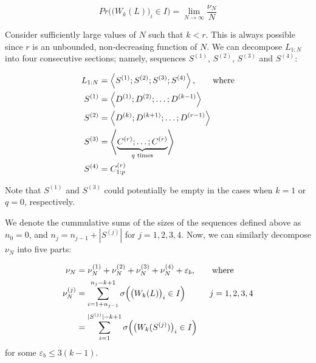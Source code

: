 \documentclass[11pt,a4paper]{tesis}
\theoremstyle{plain}
\theoremstyle{definition}
\begin{document}
\begin{equation*}
  Pr\Big( \big( W_k(L) \big)_i \in I \Big) = \lim_{N \to \infty} \frac{\nu_N}{N}
\end{equation*}

Consider sufficiently large values of $N$ such that $k < r$. This is always possible since $r$ is an unbounded, non-decreasing function of $N$. We can decompose $L_{1:N}$ into four consecutive sections; namely, sequences $S^{(1)}$, $S^{(2)}$, $S^{(3)}$ and $S^{(4)}$:

\begin{equation}
  \begin{aligned}
    L_{1:N} & = \left< S^{(1)} ; S^{(2)} ; S^{(3)} ; S^{(4)} \right> \text{, \hspace*{5mm} where} \\
    S^{(1)} & = \left< D^{(1)} ; D^{(2)} ; \dots ; D^{(k - 1)} \right> \\
    S^{(2)} & = \left< D^{(k)} ; D^{(k + 1)} ; \dots ; D^{(r - 1)} \right> \\
    S^{(3)} & = \left< \underbrace{C^{(r)} ; \dots ; C^{(r)}}_{q \text{ times}} \right> \\ 
    S^{(4)} & = C^{(r)}_{1:p}
  \end{aligned}
\end{equation}

Note that $S^{(1)}$ and $S^{(3)}$ could potentially be empty in the cases when $k = 1$ or $q = 0$, respectively.

We denote the cummulative sums of the sizes of the sequences defined above as $n_0 = 0$, and $n_j = n_{j - 1} + |S^{(j)}|$ for $j = 1, 2, 3, 4$. Now, we can similarly decompose $\nu_N$ into five parts:

\begin{equation}\label{equation:nu-n-split-five-parts}
  \begin{aligned}
    \nu_N & = \nu^{(1)}_N + \nu^{(2)}_N + \nu^{(3)}_N + \nu^{(4)}_N + \varepsilon_b \text{, \hspace*{5mm} where} \\
    \nu^{(j)}_N & = \sum_{i = 1 + n_{j - 1}}^{n_j - k + 1} \sigma\Big( \big( W_k(L) \big)_i \in I \Big) \text{\hspace*{10mm}} j = 1, 2, 3, 4 \\
                & = \sum_{i = 1}^{|S^{(j)}| - k + 1} \sigma\Big( \big( W_k(S^{(j)}) \big)_i \in I \Big)
  \end{aligned}
\end{equation}
for some $\varepsilon_b \le 3 (k - 1)$.
\end{document}
